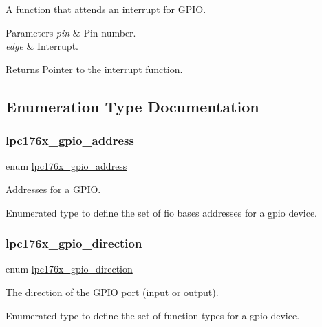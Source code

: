 A function that attends an interrupt for G\+P\+IO. 


\begin{DoxyParams}{Parameters}
{\em pin} & Pin number. \\
\hline
{\em edge} & Interrupt. \\
\hline
\end{DoxyParams}
\begin{DoxyReturn}{Returns}
Pointer to the interrupt function. 
\end{DoxyReturn}


\subsection{Enumeration Type Documentation}
\mbox{\label{gpio-defs_8h_aed5f40540b16f2964d5ec99ad21525b7}} 
\subsubsection{\texorpdfstring{lpc176x\_gpio\_address}{lpc176x\_gpio\_address}}
{\footnotesize\ttfamily enum \mbox{\hyperlink{gpio-defs_8h_aed5f40540b16f2964d5ec99ad21525b7}{lpc176x\+\_\+gpio\+\_\+address}}}



Addresses for a G\+P\+IO. 

Enumerated type to define the set of fio bases addresses for a gpio device. \mbox{\label{gpio-defs_8h_a0c9e959ab33ca3965f03caf07c8ecc17}} 
\subsubsection{\texorpdfstring{lpc176x\_gpio\_direction}{lpc176x\_gpio\_direction}}
{\footnotesize\ttfamily enum \mbox{\hyperlink{gpio-defs_8h_a0c9e959ab33ca3965f03caf07c8ecc17}{lpc176x\+\_\+gpio\+\_\+direction}}}



The direction of the G\+P\+IO port (input or output). 

Enumerated type to define the set of function types for a gpio device. \mbox{\label{gpio-defs_8h_afc30bf25b9862f6272f1bab077f8016b}} 
